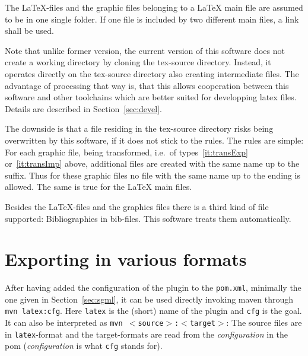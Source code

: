 The \LaTeX-files and the graphic files belonging to a \LaTeX{} main file 
are assumed to be in one single folder. 
If one file is included by two different main files, 
a link shall be used.

Note that unlike former version, 
the current version of this software does not create a working directory 
by cloning the tex-source directory. 
Instead, it operates directly on the tex-source directory 
also creating intermediate files.
The advantage of processing that way is,
that this allows cooperation between this software
and other toolchains which are better suited for developping latex files.
Details are described in Section~\ref{sec:devel}.

The downside is that a file residing in the tex-source directory 
risks being overwritten by this software, 
if it does not stick to the rules. 
The rules are simple: 
For each graphic file, being transformed, 
i.e.~of types~\ref{it:transExp} or~\ref{it:transImp} above, 
additional files are created with the same name up to the suffix. 
Thus for these graphic files no file with the same name 
up to the ending is allowed. 
The same is true for the \LaTeX{} main files.

Besides the \LaTeX-files and the graphics files
there is a third kind of file supported:
Bibliographies in bib-files.
This software treats them automatically. 


\section{Exporting in various formats}\label{sec:stableUsage}


After having added the configuration of the plugin to the \texttt{pom.xml},
minimally the one given in Section~\ref{sec:sgml},
it can be used directly invoking maven through 
\texttt{mvn latex:cfg}. 
Here \texttt{latex} is the (short) name of the plugin 
and \texttt{cfg} is the goal. 
It can also be interpreted as \texttt{mvn $<$source$>$:$<$target$>$}: 
The source files are in \texttt{latex}-format and the target-formats 
are read from the {\em configuration\/} in the pom 
({\em configuration\/} is what \texttt{cfg} stands for). 

